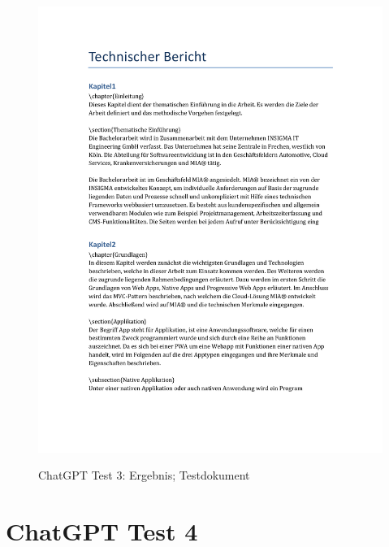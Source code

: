 \begin{figure}[H]
\centering
\includegraphics[width=1\linewidth]{Images/chatgpt_oth_forschungsbericht.pdf}\\
\caption{Chat\ac{GPT} Test 3: Ergebnis; Testdokument \cite{hoffmann_tim_2022bt}}
\label{fig:latexzudocxresult}
\end{figure}

\section{ChatGPT Test 4}

